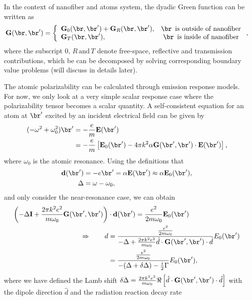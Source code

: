 \documentclass[]{report}
\begin{document}
In the context of nanofiber and atoms system, the dyadic Green function can be written as
\begin{align}
\mathbf{G}(\br,\br') = \left\{ 
\begin{array}{lc}
\mathbf{G}_0(\br,\br')+\mathbf{G}_R(\br,\br'), & \br \, \text{ is outside of nanofiber}\\
\mathbf{G}_T(\br,\br'), & \br \, \text{ is inside of nanofiber}
\end{array}\right.,
\end{align}
where the subscript $ 0,\,R\,\text{and}\,T $ denote free-space, reflective and transmission contributions, which be can be decomposed by solving corresponding boundary value problems (will discuss in details later).
 
The atomic polarizability can be calculated through emission response models. For now, we only look at a very simple scalar response case where the polarizability tensor becomes a scalar quantity. A self-consistent equation for an atom at $ \br' $ excited by an incident electrical field can be given by 
\begin{align}
(-\omega^2+\omega_0^2)\br' &= -\frac{e}{m}\mathbf{E}(\br')\\
&=-\frac{e}{m}\left[\mathbf{E}_0(\br')-4\pi k^2 {\alpha}\mathbf{G}(\br',\br')\cdot  \mathbf{E}(\br') \right],
\end{align}
where $\omega_0$ is the atomic resonance. Using the definitions that 
\begin{align}
\mathbf{d}(\br') &=-e\br'=\alpha \mathbf{E}(\br')\approx \alpha \mathbf{E}_0(\br'),\\
\Delta &=\omega-\omega_0,
\end{align}
and only consider the near-resonance case, we can obtain
\begin{align}
\left(-\Delta\mathbf{I} +\frac{2\pi k^2 e^2}{m\omega_0}\mathbf{G}(\br',\br') \right) &\cdot \mathbf{d}(\br') = \frac{e^2}{2m\omega_0}\mathbf{E}_0(\br')\\
\Rightarrow\qquad d &=\frac{\frac{e^2}{2m\omega_0}}{-\Delta+\frac{2\pi k^2 e^2}{m\omega_0}\hat{d}\cdot\mathbf{G}(\br',\br')\cdot \hat{d}}E_0(\br')\\
&=\frac{\frac{e^2}{2m\omega_0}}{-(\Delta+\delta \Delta)-\frac{i}{2}\Gamma}E_0(\br'),
\end{align}
where we have defined the Lamb shift $ \delta \Delta= \frac{2\pi k^2 e^2}{m\omega_0}\Re\left[\hat{d}\cdot\mathbf{G}(\br',\br')\cdot \hat{d} \right]$ with the dipole direction $ \hat{d} $ and the radiation reaction decay rate 
\end{document}
